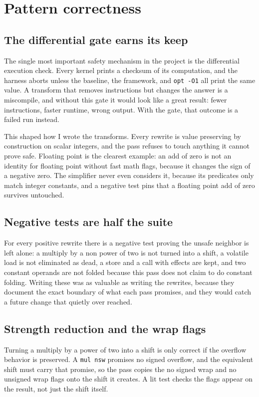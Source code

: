 \section{Pattern correctness}

\subsection{The differential gate earns its keep}

The single most important safety mechanism in the project is the differential
execution check. Every kernel prints a checksum of its computation, and the
harness aborts unless the baseline, the framework, and \texttt{opt -O1} all print
the same value. A transform that removes instructions but changes the answer is a
miscompile, and without this gate it would look like a great result: fewer
instructions, faster runtime, wrong output. With the gate, that outcome is a
failed run instead.

This shaped how I wrote the transforms. Every rewrite is value preserving by
construction on scalar integers, and the pass refuses to touch anything it cannot
prove safe. Floating point is the clearest example: an add of zero is not an
identity for floating point without fast math flags, because it changes the sign
of a negative zero. The simplifier never even considers it, because its
predicates only match integer constants, and a negative test pins that a floating
point add of zero survives untouched.

\subsection{Negative tests are half the suite}

For every positive rewrite there is a negative test proving the unsafe neighbor
is left alone: a multiply by a non power of two is not turned into a shift, a
volatile load is not eliminated as dead, a store and a call with effects are
kept, and two constant operands are not folded because this pass does not claim
to do constant folding. Writing these was as valuable as writing the rewrites,
because they document the exact boundary of what each pass promises, and they
would catch a future change that quietly over reached.

\subsection{Strength reduction and the wrap flags}

Turning a multiply by a power of two into a shift is only correct if the overflow
behavior is preserved. A \texttt{mul nsw} promises no signed overflow, and the
equivalent shift must carry that promise, so the pass copies the no signed wrap
and no unsigned wrap flags onto the shift it creates. A lit test checks the flags
appear on the result, not just the shift itself.
